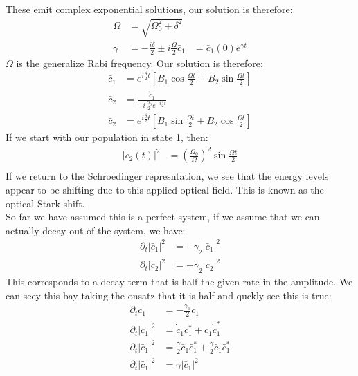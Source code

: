 These emit complex exponential solutions, our solution is therefore:
\begin{align*}
	\Omega &= \sqrt{\Omega_0^2 + \delta^2} \\
	\gamma &= -\frac{i\delta}{2} \pm i\frac{\Omega}{2}
	\bar{c}_1 &= \bar{c}_1(0) e^{\gamma t}
\end{align*}
$\Omega$ is the generalize Rabi frequency. Our solution is therefore:
\begin{align*}
	\bar{c}_1 &= e^{i\frac{\delta}{2} t} \left[ B_1 \cos \frac{\Omega t}{2} + B_2 \sin \frac{\Omega t}{2}\right] \\
	\bar{c}_2 &= \frac{\dot{\bar{c}}_1}{-i\frac{\Omega_0}{2} e^{-i\frac{\delta}{2} t}} \\
	\bar{c}_2 &= e^{i\frac{\delta}{2} t} \left[ B_1 \sin \frac{\Omega t}{2} + B_2 \cos \frac{\Omega t}{2}\right]
\end{align*}
If we start with our population in state 1, then:
\begin{align*}
	|\bar{c}_2(t)|^2 &= \left(\frac{\Omega_0}{\Omega}\right)^2 \sin \frac{\Omega t}{2} \\
\end{align*}
If we return to the Schroedinger represntation, we see that the energy levels appear to be shifting due to this applied optical field. This is known as the optical Stark shift.\\
So far we have assumed this is a perfect system, if we assume that we can actually decay out of the system, we have:
\begin{align*}
	\partial_t |\bar{c}_1|^2 &= -\gamma_2|\bar{c}_1|^2 \\
	\partial_t |\bar{c}_2|^2 &= -\gamma_2|\bar{c}_2|^2
\end{align*}
This corresponds to a decay term that is half the given rate in the amplitude. We can seey this bay taking the onsatz that it is half and quckly see this is true:
\begin{align*}
	\partial_t \bar{c}_1 &= -\frac{\gamma_1}{2} \bar{c}_1 \\
	\partial_t |\bar{c}_1|^2 &= \dot{\bar{c}}_1\bar{c}_1^* + \bar{c}_1 \dot{\bar{c}}_1^* \\
	\partial_t |\bar{c}_1|^2 &= \frac{\gamma}{2}\bar{c}_1\bar{c}_1^* + \frac{\gamma}{2}\bar{c}_1 \bar{c}_1^* \\
	\partial_t |\bar{c}_1|^2 &= \gamma |\bar{c}_1|^2
\end{align*}
